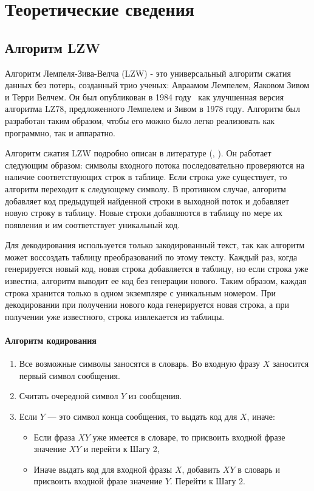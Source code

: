 \documentclass[14pt, russian]{scrartcl}
\begin{document}
\section{Теоретические сведения}
\subsection{Алгоритм LZW}
Алгоритм Лемпеля-Зива-Велча (LZW) - это универсальный алгоритм сжатия данных без потерь, созданный трио ученых: Авраамом Лемпелем, Яаковом Зивом и Терри Велчем. Он был опубликован в 1984 году~\cite{lzw} как улучшенная версия алгоритма LZ78, предложенного Лемпелем и Зивом в 1978 году. Алгоритм был разработан таким образом, чтобы его можно было легко реализовать как программно, так и аппаратно.

Алгоритм сжатия LZW подробно описан в литературе (\cite{vatolin}, \cite{lzw1}). Он работает следующим образом: символы входного потока последовательно проверяются на наличие соответствующих строк в таблице. Если строка уже существует, то алгоритм переходит к следующему символу. В противном случае, алгоритм добавляет код предыдущей найденной строки в выходной поток и добавляет новую строку в таблицу. Новые строки добавляются в таблицу по мере их появления и им соответствует уникальный код.

Для декодирования используется только закодированный текст, так как алгоритм может воссоздать таблицу преобразований по этому тексту. Каждый раз, когда генерируется новый код, новая строка добавляется в таблицу, но если строка уже известна, алгоритм выводит ее код без генерации нового. Таким образом, каждая строка хранится только в одном экземпляре с уникальным номером. При декодировании при получении нового кода генерируется новая строка, а при получении уже известного, строка извлекается из таблицы.

\paragraph* {Алгоритм кодирования}

\begin{enumerate}
\item Все возможные символы заносятся в словарь. Во входную фразу $X$ заносится первый символ сообщения.
\item Считать очередной символ $Y$ из сообщения.
\item Если $Y$ — это символ конца сообщения, то выдать код для $X$, иначе:
    \begin{itemize}
    \item Если фраза $XY$ уже имеется в словаре, то присвоить входной фразе значение $XY$ и перейти к Шагу 2,
    \item Иначе выдать код для входной фразы $X$, добавить $XY$ в словарь и присвоить входной фразе значение $Y$. Перейти к Шагу 2.
    \end{itemize}
\end{enumerate}
\end{document}

